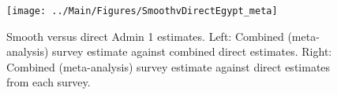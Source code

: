 \documentclass[12pt]{article}\usepackage[]{graphicx}\usepackage[]{color}
\newenvironment{knitrout}{}{} %
\begin{document}



\begin{knitrout}
\color{fgcolor}\begin{figure}[bht]

{\centering \texttt{[image: ../Main/Figures/SmoothvDirectEgypt\_meta]} 

}

\caption[Smooth versus direct Admin 1 estimates]{Smooth versus direct Admin 1 estimates. Left: Combined (meta-analysis) survey estimate against combined direct estimates. Right: Combined (meta-analysis) survey estimate against direct estimates from each survey.}\label{fig:unnamed-chunk-103}
\end{figure}


\end{knitrout}
\end{document}
